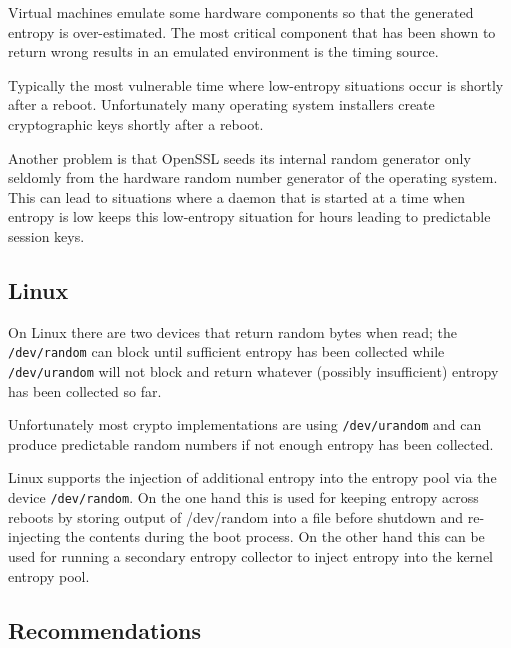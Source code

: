 Virtual machines emulate some hardware components so that the
generated entropy is over-estimated. The most critical component that
has been shown to return wrong results in an emulated environment is the
timing source\cite{Eng11,POL11}.

Typically the most vulnerable time where low-entropy situations occur is
shortly after a reboot. Unfortunately many operating system installers
create cryptographic keys shortly after a reboot\cite{HDWH12}.

Another problem is that OpenSSL seeds its internal random generator only
seldomly from the hardware random number generator of the operating
system. This can lead to situations where a daemon that is started at a
time when entropy is low keeps this low-entropy situation for hours
leading to predictable session keys\cite{HDWH12}.

\subsection{Linux}


On Linux there are two devices that return random bytes when read; the
\verb+/dev/random+ can block until sufficient entropy has been collected
while \verb+/dev/urandom+ will not block and return whatever (possibly
insufficient) entropy has been collected so far.

Unfortunately most crypto implementations are using \verb+/dev/urandom+
and can produce predictable random numbers if not enough entropy has
been collected\cite{HDWH12}.

Linux supports the injection of additional entropy into the entropy pool
via the device \verb+/dev/random+. On the one hand this is used for
keeping entropy across reboots by storing output of /dev/random into a
file before shutdown and re-injecting the contents during the boot
process. On the other hand this can be used for running a secondary
entropy collector to inject entropy into the kernel entropy pool.



\subsection{Recommendations}

